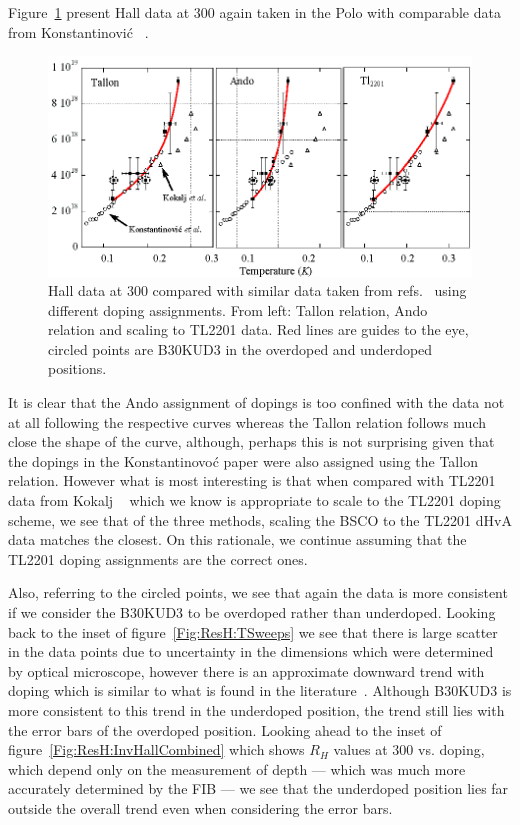 Figure~\ref{Fig:ResH:Rh300Comparison} present Hall data at \unit{300}{\kelvin} again taken in the Polo with comparable data from Konstantinovi\'c \etal~\cite{Konstantinovic2001}.
\begin{figure}[htbp]
    \begin{center}
        \includegraphics[scale=1.1]{Chapter-HallBSCO/Figures/Rh300Comparison/Rh300Comparison}
        \caption{Hall data at \unit{300}{\kelvin} compared with similar data taken from refs.~\cite{Konstantinovic2001, Kokalj2012} using different doping assignments. From left: Tallon relation, Ando relation and scaling to \ac{TL2201} data. Red lines are guides to the eye, circled points are B30KUD3 in the overdoped and underdoped positions.}
        \label{Fig:ResH:Rh300Comparison}
    \end{center}
\end{figure}
It is clear that the Ando assignment of dopings is too confined with the data not at all following the respective curves whereas the Tallon relation follows much close the shape of the curve, although, perhaps this is not surprising given that the dopings in the Konstantinovo\'c paper were also assigned using the Tallon relation. However what is most interesting is that when compared with \ac{TL2201} data from Kokalj \etal~\cite{Kokalj2012} which we know is appropriate to scale to the \ac{TL2201} doping scheme, we see that of the three methods, scaling the \ac{BSCO} to the \ac{TL2201} \ac{dHvA} data matches the closest. On this rationale, we continue assuming that the \ac{TL2201} doping assignments are the correct ones.

Also, referring to the circled points, we see that again the data is more consistent if we consider the B30KUD3 to be overdoped rather than underdoped. Looking back to the inset of figure~\ref{Fig:ResH:TSweeps} we see that there is large scatter in the data points due to uncertainty in the dimensions which were determined by optical microscope, however there is an approximate downward trend with doping which is similar to what is found in the literature~\cite{Ando2000, Ando1999, Konstantinovic2001, Ono2000}. Although B30KUD3 is more consistent to this trend in the underdoped position, the trend still lies with the error bars of the overdoped position. Looking ahead to the inset of figure~\ref{Fig:ResH:InvHallCombined} which shows $R_H$ values at \unit{300}{\kelvin} vs. doping, which depend only on the measurement of depth --- which was much more accurately determined by the \ac{FIB} --- we see that the underdoped position lies far outside the overall trend even when considering the error bars. 

